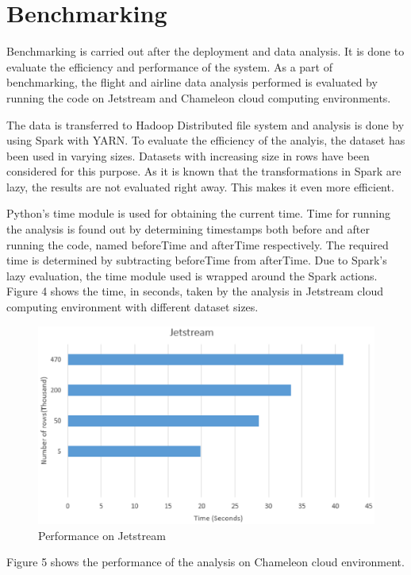 \documentclass[9pt,twocolumn,twoside]{../../styles/osajnl}
\begin{document}
\section{Benchmarking}

Benchmarking is carried out after the deployment and data analysis. It
is done to evaluate the efficiency and performance of the system. As a
part of benchmarking, the flight and airline data analysis performed
is evaluated by running the code on Jetstream and Chameleon cloud
computing environments.

The data is transferred to Hadoop Distributed file system and analysis
is done by using Spark with YARN. To evaluate the efficiency of the
analyis, the dataset has been used in varying sizes. Datasets with
increasing size in rows have been considered for this purpose. As it
is known that the transformations in Spark are lazy, the results are
not evaluated right away. This makes it even more efficient.

Python's time module is used for obtaining the current time. Time for
running the analysis is found out by determining timestamps both
before and after running the code, named beforeTime and afterTime
respectively. The required time is determined by subtracting
beforeTime from afterTime. Due to Spark's lazy evaluation, the time
module used is wrapped around the Spark actions. Figure 4 shows the
time, in seconds, taken by the analysis in Jetstream cloud computing
environment with different dataset sizes.

\begin{figure}[ht]
  \includegraphics[scale=0.50]{images/jsBench.eps}
  \caption{Performance on Jetstream}
\end{figure}

Figure 5 shows the performance of the analysis on Chameleon cloud
environment.
\end{document}
